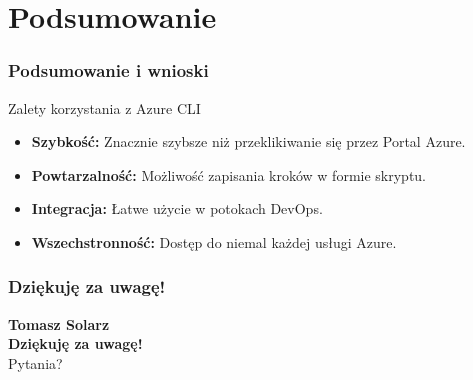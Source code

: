 \documentclass[10pt]{beamer}
\begin{document}
\section{Podsumowanie}
\begin{frame}
    \frametitle{Podsumowanie i wnioski}
    \begin{block}{Zalety korzystania z Azure CLI}
    \begin{itemize}
        \item \textbf{Szybkość:} Znacznie szybsze niż przeklikiwanie się przez Portal Azure.
        \item \textbf{Powtarzalność:} Możliwość zapisania kroków w formie skryptu.
        \item \textbf{Integracja:} Łatwe użycie w potokach DevOps.
        \item \textbf{Wszechstronność:} Dostęp do niemal każdej usługi Azure.
    \end{itemize}
    \end{block}  
\end{frame}

\begin{frame}
	\frametitle{Dziękuję za uwagę!}
	\begin{center}
	\textbf{Tomasz Solarz}\\[1cm]
	\textbf{Dziękuję za uwagę!}\\
    Pytania?
	\end{center}
\end{frame}
\end{document}
